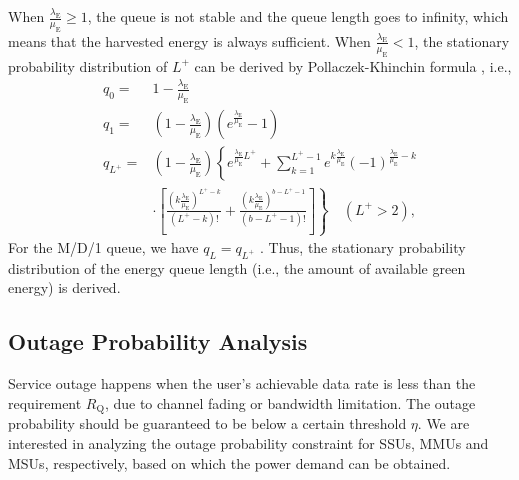 \documentclass[12pt, draftclsnofoot,onecolumn]{IEEEtran}
\begin{document}
When $\frac{\lambda_\mathrm{E}}{\mu_\mathrm{E}} \geq 1$, the queue is not stable and the queue length goes to infinity, which means that the harvested energy is always sufficient.
When $\frac{\lambda_\mathrm{E}}{\mu_\mathrm{E}}<1$, the stationary probability distribution of $L^+$ can be derived by Pollaczek-Khinchin formula \cite{MD1_queue}, i.e.,
\begin{equation}\label{eq_MD1_steady}
    \begin{split}
        q_0 = & 1-\frac{\lambda_\mathrm{E}}{\mu_\mathrm{E}} \\
        q_1 = & (1-\frac{\lambda_\mathrm{E}}{\mu_\mathrm{E}})(e^{\frac{\lambda_\mathrm{E}}{\mu_\mathrm{E}}} - 1)\\
        q_{L^+} = & (1-\frac{\lambda_\mathrm{E}}{\mu_\mathrm{E}})\left\{ e^{\frac{\lambda_\mathrm{E}}{\mu_\mathrm{E}}{L^+} } + \sum_{k=1}^{{L^+}-1}e^{k \frac{\lambda_\mathrm{E}}{\mu_\mathrm{E}}} (-1)^{\frac{\lambda_\mathrm{E}}{\mu_\mathrm{E}} -k} \right.\\
        & \left. \cdot \left[\frac{(k \frac{\lambda_\mathrm{E}}{\mu_\mathrm{E}})^{{L^+}-k}}{({L^+}-k)!}+\frac{(k \frac{\lambda_\mathrm{E}}{\mu_\mathrm{E}} )^{b-{L^+}-1}}{(b-{L^+}-1)!} \right]\right\} \quad ({L^+}>2),
    \end{split}
\end{equation}
For the M/D/1 queue, we have $q_L = q_{L^+}$ \cite{MD1_queue}.
Thus, the stationary probability distribution of the energy queue length (i.e., the amount of available green energy) is derived.

\subsection{Outage Probability Analysis}

Service outage happens when the user's achievable data rate is less than the requirement $R_\mathrm{Q}$, due to channel fading or bandwidth limitation.
The outage probability should be guaranteed to be below a certain threshold $\eta$.
We are interested in analyzing the outage probability constraint for SSUs, MMUs and MSUs, respectively, based on which the power demand can be obtained.
\end{document}
